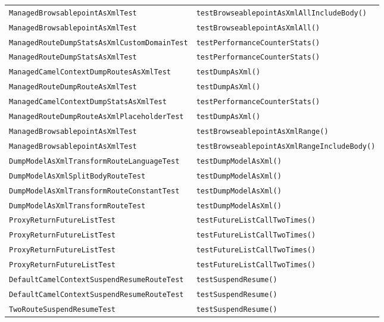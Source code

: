 \begin{center}
\begin{longtable}{ll}
\lstinline/ManagedBrowsablepointAsXmlTest/&{\lstinline/testBrowseablepointAsXmlAllIncludeBody()/}\\
\lstinline/ManagedBrowsablepointAsXmlTest/&{\lstinline/testBrowseablepointAsXmlAll()/}\\
\lstinline/ManagedRouteDumpStatsAsXmlCustomDomainTest/&{\lstinline/testPerformanceCounterStats()/}\\
\lstinline/ManagedRouteDumpStatsAsXmlTest/&{\lstinline/testPerformanceCounterStats()/}\\
\lstinline/ManagedCamelContextDumpRoutesAsXmlTest/&{\lstinline/testDumpAsXml()/}\\
\lstinline/ManagedRouteDumpRouteAsXmlTest/&{\lstinline/testDumpAsXml()/}\\
\lstinline/ManagedCamelContextDumpStatsAsXmlTest/&{\lstinline/testPerformanceCounterStats()/}\\
\lstinline/ManagedRouteDumpRouteAsXmlPlaceholderTest/&{\lstinline/testDumpAsXml()/}\\
\lstinline/ManagedBrowsablepointAsXmlTest/&{\lstinline/testBrowseablepointAsXmlRange()/}\\
\lstinline/ManagedBrowsablepointAsXmlTest/&{\lstinline/testBrowseablepointAsXmlRangeIncludeBody()/}\\
\lstinline/DumpModelAsXmlTransformRouteLanguageTest/&{\lstinline/testDumpModelAsXml()/}\\
\lstinline/DumpModelAsXmlSplitBodyRouteTest/&{\lstinline/testDumpModelAsXml()/}\\
\lstinline/DumpModelAsXmlTransformRouteConstantTest/&{\lstinline/testDumpModelAsXml()/}\\
\lstinline/DumpModelAsXmlTransformRouteTest/&{\lstinline/testDumpModelAsXml()/}\\
\lstinline/ProxyReturnFutureListTest/&{\lstinline/testFutureListCallTwoTimes()/}\\
\lstinline/ProxyReturnFutureListTest/&{\lstinline/testFutureListCallTwoTimes()/}\\
\lstinline/ProxyReturnFutureListTest/&{\lstinline/testFutureListCallTwoTimes()/}\\
\lstinline/ProxyReturnFutureListTest/&{\lstinline/testFutureListCallTwoTimes()/}\\
\lstinline/DefaultCamelContextSuspendResumeRouteTest/&{\lstinline/testSuspendResume()/}\\
\lstinline/DefaultCamelContextSuspendResumeRouteTest/&{\lstinline/testSuspendResume()/}\\
\lstinline/TwoRouteSuspendResumeTest/&{\lstinline/testSuspendResume()/}\\

\end{longtable}
\end{center}

